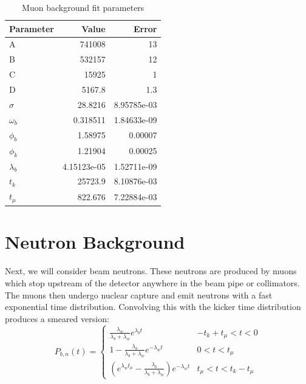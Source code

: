 \begin{table}[h]
  \begin{center}
    \caption{Muon background fit parameters}
    \label{tab:mu_params}
    \begin{tabular}{ | l | r | r | }
      \hline
      Parameter   & Value       & Error       \\
      \hline
      A           & 741008      & 13 \\
      B           & 532157      & 12 \\
      C           & 15925       & 1 \\
      D           & 5167.8      & 1.3 \\
      $\sigma$    & 28.8216     & 8.95785e-03 \\
      $\omega_b$  & 0.318511    & 1.84633e-09 \\
      $\phi_b$    & 1.58975     & 0.00007     \\
      $\phi_k$    & 1.21904     & 0.00025     \\
      $\lambda_b$ & 4.15123e-05 & 1.52711e-09 \\
      $t_{k}$     & 25723.9     & 8.10876e-03 \\
      $t_{\mu}$   & 822.676     & 7.22884e-03 \\
      \hline
    \end{tabular}
  \end{center}
\end{table}

\section{Neutron Background}

Next, we will consider beam neutrons.
These neutrons are produced by muons which stop upstream of the detector anywhere in the beam pipe or collimators.
The muons then undergo nuclear capture and emit neutrons with a fast exponential time distribution.
Convolving this with the kicker time distribution produces a smeared version:
\begin{equation}
P_{b,n}(t) = \begin{cases} \frac{\lambda_w}{\lambda_b + \lambda_w} e^{\lambda_b t}                            & -t_k+t_{\mu}<t<0 \\
1 - \frac{\lambda_b}{\lambda_b + \lambda_w} e^{-\lambda_w t}                       & 0<t<t_{\mu} \\
(e^{\lambda_w t_{\mu}} - \frac{\lambda_b}{\lambda_b + \lambda_w}) e^{-\lambda_w t} & t_{\mu}<t<t_k-t_{\mu} \end{cases}
\label{eq:kicker_neutron}
\end{equation}

